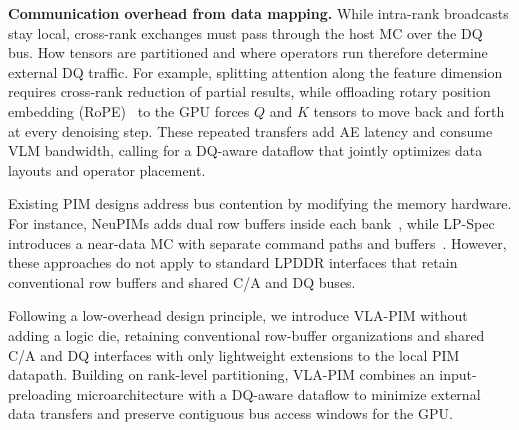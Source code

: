 \textbf{Communication overhead from data mapping.} While intra-rank broadcasts stay local, cross-rank exchanges must pass through the host MC over the DQ bus. How tensors are partitioned and where operators run therefore determine external DQ traffic. For example, splitting attention along the feature dimension requires cross-rank reduction of partial results, while offloading rotary position embedding (RoPE)~\cite{roformer} to the GPU forces $Q$ and $K$ tensors to move back and forth at every denoising step. These repeated transfers add AE latency and consume VLM bandwidth, calling for a DQ-aware dataflow that jointly optimizes data layouts and operator placement.

Existing PIM designs address bus contention by modifying the memory hardware. For instance, NeuPIMs adds dual row buffers inside each bank~\cite{neupims}, while LP-Spec introduces a near-data MC with separate command paths and buffers~\cite{lp_spec}. However, these approaches do not apply to standard LPDDR interfaces that retain conventional row buffers and shared C/A and DQ buses.

Following a low-overhead design principle, we introduce VLA-PIM without adding a logic die, retaining conventional row-buffer organizations and shared C/A and DQ interfaces with only lightweight extensions to the local PIM datapath. Building on rank-level partitioning, VLA-PIM combines an input-preloading microarchitecture with a DQ-aware dataflow to minimize external data transfers and preserve contiguous bus access windows for the GPU.
